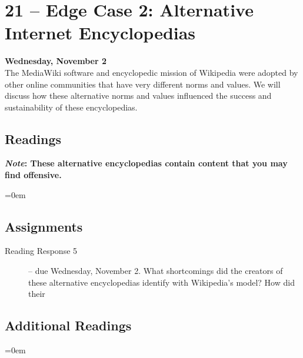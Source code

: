 \documentclass[11pt]{memoir}
\newenvironment{readinglist}{
\begin{list}{}{\leftmargin=8pt \itemindent=0em}
  \setlength{\itemsep}{8pt}
  \setlength{\parskip}{0em}
  \setlength{\parsep}{1em}
  \setlength{\parindent}{8em}}
{\end{list}}
\begin{document}
\section{21 -- Edge Case 2: Alternative Internet Encyclopedias}
\textcolor{CUGold}{\textbf{Wednesday, November 2}}\\
The MediaWiki software and encyclopedic mission of Wikipedia were adopted by other online communities that have very different norms and values. We will discuss how these alternative norms and values influenced the success and sustainability of these encyclopedias.

    \subsection{Readings}
    \textbf{\textit{Note}: These alternative encyclopedias contain content that you may find offensive.}\vspace{-10pt}
    \begin{readinglist}
        \item {}
        \item {}
        \item {}
        \item {}
        \item {}
        \item {}
    \end{readinglist}
    
    \subsection{Assignments}
    \begin{description}%
        \item[Reading Response 5 ] -- due Wednesday, November 2. What shortcomings did the creators of these alternative encyclopedias identify with Wikipedia's model? How did their
    \end{description}
    
    \subsection{Additional Readings}
    \begin{readinglist}
        \item {}
        \item {}
        \item {}
        \item {}
        \item {}
        \item {}
    \end{readinglist}
    
\end{document}
